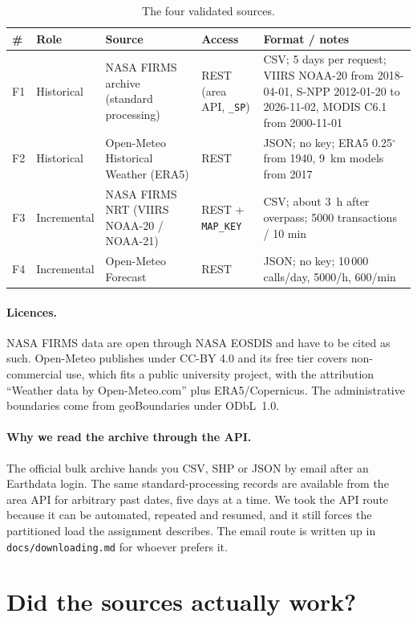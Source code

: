 \documentclass[11pt,a4paper]{article}
\newcommand{\code}[1]{\texttt{\small #1}}
\begin{document}
\begin{table}[h]
\centering
\small
\begin{tabular}{L{1.1cm}L{2.9cm}L{4.3cm}L{2.2cm}L{4.2cm}}
\toprule
\textbf{\#} & \textbf{Role} & \textbf{Source} & \textbf{Access} & \textbf{Format / notes} \\
\midrule
F1 & Historical & NASA FIRMS archive (standard processing) & REST (area API, \code{*\_SP}) & CSV; 5 days per request; VIIRS NOAA-20 from 2018-04-01, S-NPP 2012-01-20 to 2026-11-02, MODIS C6.1 from 2000-11-01 \\
F2 & Historical & Open-Meteo Historical Weather (ERA5) & REST & JSON; no key; ERA5 0.25$^\circ$ from 1940, 9~km models from 2017 \\
F3 & Incremental & NASA FIRMS NRT (VIIRS NOAA-20 / NOAA-21) & REST + \code{MAP\_KEY} & CSV; about 3~h after overpass; 5000 transactions / 10 min \\
F4 & Incremental & Open-Meteo Forecast & REST & JSON; no key; 10\,000 calls/day, 5000/h, 600/min \\
\bottomrule
\end{tabular}
\caption{The four validated sources.}
\end{table}

\paragraph{Licences.} NASA FIRMS data are open through NASA EOSDIS and have to be cited as such.
Open-Meteo publishes under CC-BY 4.0 and its free tier covers non-commercial use, which fits a
public university project, with the attribution ``Weather data by Open-Meteo.com'' plus
ERA5/Copernicus. The administrative boundaries come from geoBoundaries under ODbL~1.0.

\paragraph{Why we read the archive through the API.} The official bulk archive hands you CSV, SHP or
JSON by email after an Earthdata login. The same standard-processing records are available from the
area API for arbitrary past dates, five days at a time. We took the API route because it can be
automated, repeated and resumed, and it still forces the partitioned load the assignment describes.
The email route is written up in \code{docs/downloading.md} for whoever prefers it.

\section{Did the sources actually work?}
\end{document}
